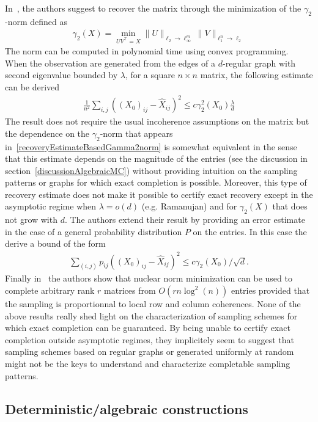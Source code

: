 \documentclass[12pt]{article}
\begin{document}
In~\cite{heiman2014deterministic}, the authors suggest to recover the matrix through the minimization of the $\gamma_2$-norm defined as 
\begin{align}
\gamma_2(X) = \min_{UV^\intercal  = X} \|U\|_{\ell_2\rightarrow \ell_{\infty}^m} \|V\|_{\ell_1^n \rightarrow \ell_2}
\end{align}
The norm can be computed in polynomial time using convex programming.  When the observation are generated from the edges of a $d$-regular graph with second eigenvalue bounded by $\lambda$, for a square $n\times n$ matrix, the following estimate can be derived
\begin{align}
\frac{1}{n^2}\sum_{i,j} ((X_0)_{ij} - \hat{X}_{ij})^2 \leq c\gamma_2^2(X_0)\frac{\lambda}{d}\label{recoveryEstimateBasedGamma2norm}
\end{align}
The result does not require the usual incoherence assumptions on the matrix but the dependence on the $\gamma_2$-norm that appears in~\eqref{recoveryEstimateBasedGamma2norm} is somewhat equivalent in the sense that this estimate depends on the magnitude of the entries (see the discussion in section~\ref{discussionAlgebraicMC}) without providing intuition on the sampling patterns or graphs for which exact completion is possible.  Moreover, this type of recovery estimate does not make it possible to certify exact recovery except in the asymptotic regime when $\lambda = o(d)$ (e.g. Ramanujan) and for $\gamma_2(X)$ that does not grow with $d$.  The authors extend their result by providing an error estimate in the case of a general probability distribution $P$ on the entries. In this case the derive a bound of the form
\begin{align}
\sum_{(i,j)} p_{ij} ((X_0)_{ij} - \hat{X}_{ij})^2 \leq c\gamma_2(X_0)/\sqrt{d}.
\end{align}
Finally in~\cite{chen2014coherent} the authors show that nuclear norm minimization can be used to complete arbitrary rank $r$ matrices from $O(rn \log^2(n))$ entries provided that the sampling is proportionnal to local row and column coherences.  None of the above results really shed light on the characterization of sampling schemes for which exact completion can be guaranteed.  By being unable to certify exact completion outside asymptotic regimes, they implicitely seem to suggest that sampling schemes based on regular graphs or generated uniformly at random might not be the keys to understand and characterize completable sampling patterns. 

\subsection{\label{discussionAlgebraicMC}Deterministic/algebraic constructions}
\end{document}
